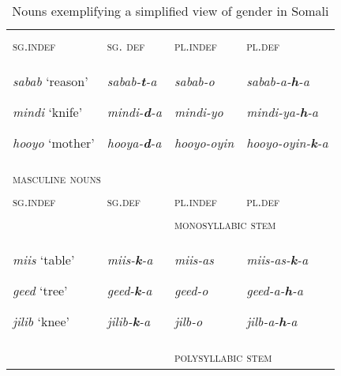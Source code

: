 \documentclass[output=paper]{langsci/langscibook}
\begin{document}
\begin{table}
\caption{Nouns exemplifying a simplified view of gender in Somali}
\label{tab:6}


\begin{tabularx}{\textwidth}{XXXX}
\lsptoprule
\multicolumn{2}{X}{{\textsc{feminine nouns}}

} &  & \\
{\textsc{sg.indef}} & {\textsc{sg. def}} & {\textsc{pl.indef}} & {\textsc{pl.def}}\\
{\textit{sabab} ‘reason’}

{\textit{mindi} ‘knife’}

{\textit{hooyo} ‘mother’} & {\textit{sabab-}\textbf{\textit{t}}\textit{{}-a}}

{\textit{mindi-}\textbf{\textit{d}}\textit{{}-a}}

{\textit{hooya-}\textbf{\textit{d}}\textit{{}-a}} & {\textit{sabab-o}}

{\textit{mindi-yo}}

{\textit{hooyo-oyin}} & {\textit{sabab-a-}\textbf{\textit{h}}\textit{{}-a}}

{\textit{mindi-ya-}\textbf{\textit{h}}\textit{{}-a}}

{\textit{hooyo-oyin-}\textbf{\textit{k}}\textit{{}-a}}\\
\multicolumn{2}{X}{{\textsc{masculine nouns}}

} &  & \\
{\textsc{sg.indef}} & {\textsc{sg.def}} & {\textsc{pl.indef}} & {\textsc{pl.def}}\\
&  & \multicolumn{2}{X}{{\textsc{monosyllabic stem}}

}\\
\hhline{~~--}
{\textit{miis} ‘table’}

{\textit{geed} ‘tree’}

{\textit{jilib} ‘knee’} & {\textit{miis-}\textbf{\textit{k}}\textit{{}-a}}

{\textit{geed-}\textbf{\textit{k}}\textit{{}-a}}

{\textit{jilib-}\textbf{\textit{k}}\textit{{}-a}} & {\textit{miis-as}}

{\textit{geed-o}}

{\textit{jilb-o}} & {\textit{miis-as-}\textbf{\textit{k}}\textit{{}-a}}

{\textit{geed-a-}\textbf{\textit{h}}\textit{{}-a}}

{\textit{jilb-a-}\textbf{\textit{h}}\textit{{}-a}}\\
&  & \multicolumn{2}{X}{{\textsc{polysyllabic stem}}

}
\end{tabularx}
\end{table}
\end{document}
